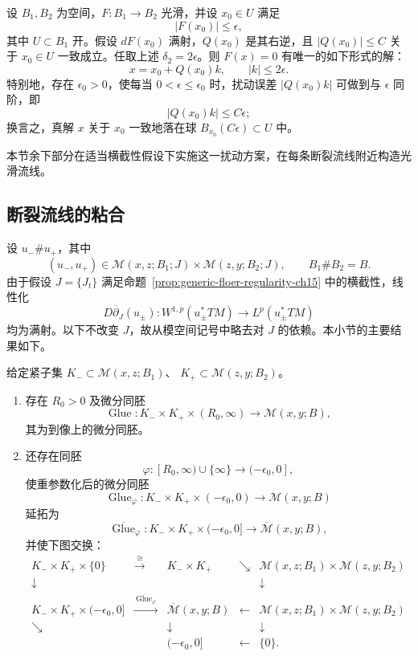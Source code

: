 \begin{proposition}
\label{prop:abstract-gluing-perturbation}
设 $B_1,B_2$ 为\personBanach{}空间，$F:B_1\to B_2$ 光滑，并设 $x_0\in U$ 满足
\[
 |F(x_0)|\leq\epsilon,
\]
其中 $U\subset B_1$ 开。假设 $dF(x_0)$ 满射，$Q(x_0)$ 是其右逆，且
$|Q(x_0)|\leq C$ 关于 $x_0\in U$ 一致成立。任取上述
$\delta_2=2\epsilon$。则 $F(x)=0$ 有唯一的如下形式的解：
\[
 x=x_0+Q(x_0)k,
 \qquad |k|\leq2\epsilon.
\]
特别地，存在 $\epsilon_0>0$，使每当 $0<\epsilon\leq\epsilon_0$ 时，扰动误差
$|Q(x_0)k|$ 可做到与 $\epsilon$ 同阶，即
\[
 |Q(x_0)k|\leq C\epsilon;
\]
换言之，真解 $x$ 关于 $x_0$ 一致地落在球 $B_{x_0}(C\epsilon)\subset U$ 中。
\end{proposition}

本节余下部分在适当横截性假设下实施这一扰动方案，在每条断裂流线附近构造光滑\personFloer{}流线。

\subsection{断裂流线的粘合}
\label{subsec:gluing-broken-trajectories}

设 $u_-\#u_+$，其中
\[
 (u_-,u_+)\in\mathcal M(x,z;B_1;J)\times\mathcal M(z,y;B_2;J),
 \qquad B_1\#B_2=B.
\]
由于假设 $J=\{J_t\}$ 满足命题~\ref{prop:generic-floer-regularity-ch15}
中的横截性，线性化
\[
 D\overline\partial_J(u_\pm):W^{1,p}(u_\pm^*TM)
 \longrightarrow L^p(u_\pm^*TM)
\]
均为满射。以下不改变 $J$，故从模空间记号中略去对 $J$ 的依赖。本小节的主要结果如下。

\begin{theorem}
\label{thm:gluing-broken-floer-trajectories}
给定紧子集 $K_-\subset\mathcal M(x,z;B_1)$、
$K_+\subset\mathcal M(z,y;B_2)$。
\begin{enumerate}[label=(\arabic*)]
\item 存在 $R_0>0$ 及微分同胚
\[
 \operatorname{Glue}:K_-\times K_+\times(R_0,\infty)
 \longrightarrow\mathcal M(x,y;B),
\]
其为到像上的微分同胚。
\item 还存在同胚
\[
 \varphi:[R_0,\infty)\cup\{\infty\}\longrightarrow(-\epsilon_0,0],
\]
使重参数化后的微分同胚
\[
 \operatorname{Glue}_\varphi:
 K_-\times K_+\times(-\epsilon_0,0)\longrightarrow\mathcal M(x,y;B)
\]
延拓为
\[
 \overline{\operatorname{Glue}}_\varphi:
 K_-\times K_+\times(-\epsilon_0,0]\longrightarrow
 \overline{\mathcal M}(x,y;B),
\]
并使下图交换：
\[
\begin{array}{ccccc}
 K_-\times K_+\times\{0\}&\xrightarrow{\ \cong\ }&K_-\times K_+
 &\searrow&\mathcal M(x,z;B_1)\times\mathcal M(z,y;B_2)\\
 \downarrow&&&&\downarrow\\
 K_-\times K_+\times(-\epsilon_0,0]&
 \xrightarrow{\ \overline{\operatorname{Glue}}_\varphi\ }&
 \overline{\mathcal M}(x,y;B)&\longleftarrow&
 \mathcal M(x,z;B_1)\times\mathcal M(z,y;B_2)\\
 \searrow&&\downarrow&&\downarrow\\
 &&(-\epsilon_0,0]&\longleftarrow&\{0\}.
\end{array}
\]
\end{enumerate}
\end{theorem}

